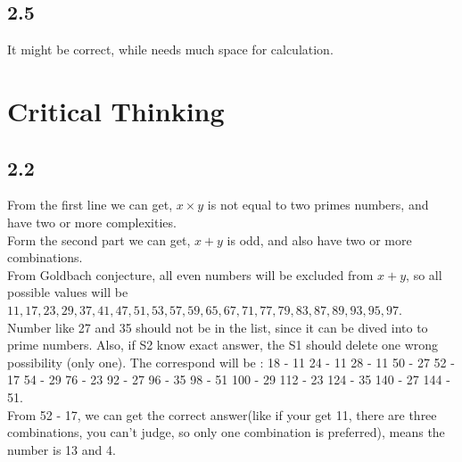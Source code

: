 \documentclass{article}
\begin{document}
\subsection*{2.5}
It might be correct, while needs much space for calculation.
\section{Critical Thinking}
\subsection*{2.2}
From the first line we can get, $x\times y$ is not equal to two primes numbers, and have two or more complexities.
\\Form the second part we can get, $x+ y$ is odd, and also have two or more combinations.
\\From Goldbach conjecture, all even numbers will be excluded from $x+y$, so all possible values will be $11, 17, 23, 29, 37, 41, 47, 51, 53, 57, 59, 65, 67, 71, 77, 79, 83, 87, 89, 93, 95, 97$.
\\Number like 27 and 35 should not be in the list, since it can be dived into to prime numbers.
Also, if S2 know exact answer, the S1 should delete one wrong possibility (only one). The correspond will be :
18 - 11
24 - 11
28 - 11
50 - 27
52 - 17
54 - 29
76 - 23
92 - 27
96 - 35
98 - 51
100 - 29
112 - 23
124 - 35
140 - 27
144 - 51.
\\From 52 - 17, we can get the correct answer(like if your get 11, there are three combinations, you can't judge, so only one combination is preferred), means the number is 13 and 4.
\end{document}
